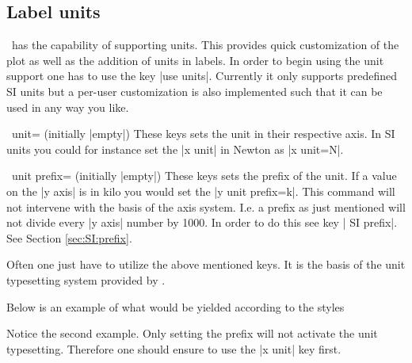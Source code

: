 \subsection{Label units}
\label{sec:units}

 \PGFPlots\ has the capability of supporting units. This provides quick customization of the plot as well as the addition of units in labels. In order to
 begin using the unit support one has to use the key |use units|. Currently it only supports predefined SI units but a per-user customization is also
 implemented such that it can be used in any way you like.
\begin{pgfplotsxykey}{\x\ unit= (initially |empty|)}
  These keys sets the unit in their respective axis. In SI units you could for instance set the |x unit| in Newton as |x unit=N|.
\end{pgfplotsxykey}
\begin{pgfplotsxykey}{\x\ unit prefix= (initially |empty|)}
  These keys sets the prefix of the unit. If a value on the |y axis| is in kilo you would set the |y unit prefix=k|. This command will not intervene with
  the basis of the axis system. I.e. a prefix as just mentioned will not divide every |y axis| number by 1000. In order to do this see key | SI prefix|. See Section \ref{sec:SI:prefix}.
\end{pgfplotsxykey}
Often one just have to utilize the above mentioned keys. It is the basis of the unit typesetting system provided by \PGFPlots. 
\begin{codeexample}[]
\end{codeexample}

Below is an example of what would be yielded according to the styles
\begin{codeexample}
  \pgfplotsset{use units,x unit=T,xlabel=Temperature,ylabel=Nothing} 
  \pgfplotsset{use units,x unit prefix=m,xlabel=Temperature,ylabel=Nothing} 
\end{codeexample}
Notice the second example. Only setting the prefix will not activate the unit typesetting. Therefore one should ensure to use the |x unit| key first.

